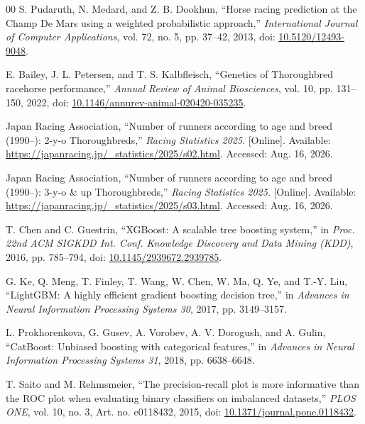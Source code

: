 \begin{thebibliography}{00}
S. Pudaruth, N. Medard, and Z. B. Dookhun, ``Horse racing prediction at the Champ De Mars using a weighted probabilistic approach,'' \emph{International Journal of Computer Applications}, vol. 72, no. 5, pp. 37--42, 2013, doi: \url{10.5120/12493-9048}.

E. Bailey, J. L. Petersen, and T. S. Kalbfleisch, ``Genetics of Thoroughbred racehorse performance,'' \emph{Annual Review of Animal Biosciences}, vol. 10, pp. 131--150, 2022, doi: \url{10.1146/annurev-animal-020420-035235}.

Japan Racing Association, ``Number of runners according to age and breed (1990--): 2-y-o Thoroughbreds,'' \emph{Racing Statistics 2025}. [Online]. Available: \url{https://japanracing.jp/_statistics/2025/s02.html}. Accessed: Aug. 16, 2026.

Japan Racing Association, ``Number of runners according to age and breed (1990--): 3-y-o \& up Thoroughbreds,'' \emph{Racing Statistics 2025}. [Online]. Available: \url{https://japanracing.jp/_statistics/2025/s03.html}. Accessed: Aug. 16, 2026.

T. Chen and C. Guestrin, ``XGBoost: A scalable tree boosting system,'' in \emph{Proc. 22nd ACM SIGKDD Int. Conf. Knowledge Discovery and Data Mining (KDD)}, 2016, pp. 785--794, doi: \url{10.1145/2939672.2939785}.

G. Ke, Q. Meng, T. Finley, T. Wang, W. Chen, W. Ma, Q. Ye, and T.-Y. Liu, ``LightGBM: A highly efficient gradient boosting decision tree,'' in \emph{Advances in Neural Information Processing Systems 30}, 2017, pp. 3149--3157.

L. Prokhorenkova, G. Gusev, A. Vorobev, A. V. Dorogush, and A. Gulin, ``CatBoost: Unbiased boosting with categorical features,'' in \emph{Advances in Neural Information Processing Systems 31}, 2018, pp. 6638--6648.

T. Saito and M. Rehmsmeier, ``The precision-recall plot is more informative than the ROC plot when evaluating binary classifiers on imbalanced datasets,'' \emph{PLOS ONE}, vol. 10, no. 3, Art. no. e0118432, 2015, doi: \url{10.1371/journal.pone.0118432}.

\end{thebibliography}
